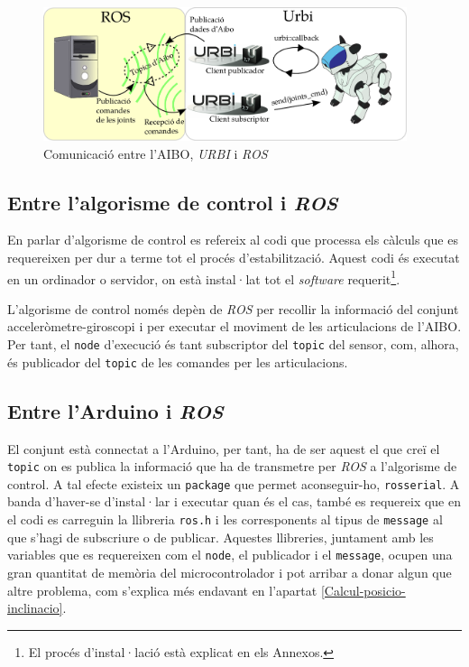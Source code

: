 \documentclass[12pt,a4paper,final,twoside]{report}
\begin{document}
\begin{figure}[tb]
\centering
\includegraphics[width=0.95\textwidth]{Imatges/Comunicacio-ROS-Urbi-Aibo.pdf}
\caption{Comunicació entre l'AIBO, \textit{URBI} i \textit{ROS}}
\label{fig:Comunicacio-ROS-Urbi-AIBO}
\end{figure}


\subsection{Entre l'algorisme de control i \textit{ROS}}

En parlar d'algorisme de control es refereix al codi que processa els càlculs que es requereixen per dur a terme tot el procés d'estabilització. Aquest codi és executat en un ordinador o servidor, on està instal·lat tot el \textit{software} requerit\footnote{El procés d'instal·lació està explicat en els Annexos.}. 

L'algorisme de control només depèn de \textit{ROS} per recollir la informació del conjunt acceleròmetre-giroscopi i per executar el moviment de les articulacions de l'AIBO. Per tant, el \texttt{node} d'execució és tant subscriptor del \texttt{topic} del sensor, com, alhora, és publicador del \texttt{topic} de les comandes per les articulacions.


\subsection{Entre l'Arduino i \textit{ROS}}
\label{comunicacio-ROS-Arduino}


El conjunt està connectat a l'Arduino, per tant, ha de ser aquest el que creï el \texttt{topic} on es publica la informació que ha de transmetre per \textit{ROS} a l'algorisme de control. A tal efecte existeix un \texttt{package} que permet aconseguir-ho, \texttt{rosserial}. A banda d'haver-se d'instal·lar i executar quan és el cas, també es requereix que en el codi es carreguin la llibreria \texttt{ros.h} i les corresponents al tipus de \texttt{message} al que s'hagi de subscriure o de publicar. Aquestes llibreries, juntament amb les variables que es requereixen com el \texttt{node}, el publicador i el \texttt{message}, ocupen una gran quantitat de memòria del microcontrolador i pot arribar a donar algun que altre problema, com s'explica més endavant en l'apartat \ref{Calcul-posicio-inclinacio}. 
\end{document}
